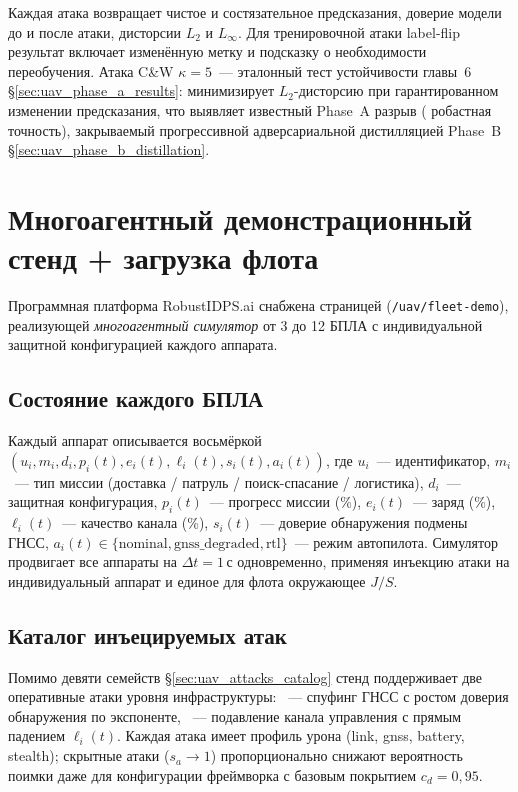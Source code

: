 Каждая атака возвращает чистое и состязательное предсказания,
доверие модели до и после атаки, дисторсии $L_2$ и $L_\infty$. Для
тренировочной атаки label-flip результат включает изменённую
метку и подсказку о необходимости переобучения. Атака C\&W
$\kappa{=}5$~--- эталонный тест устойчивости главы~6 \S\ref{sec:uav_phase_a_results}:
минимизирует $L_2$-дисторсию при гарантированном изменении
предсказания, что выявляет известный Phase~A разрыв (
робастная точность), закрываемый прогрессивной адверсариальной
дистилляцией Phase~B \S\ref{sec:uav_phase_b_distillation}.

\section{Многоагентный демонстрационный стенд + загрузка флота}
\label{sec:uav_fleet_demo}

Программная платформа RobustIDPS.ai снабжена страницей
 (\texttt{/uav/fleet-demo}), реализующей
\emph{многоагентный симулятор} от 3 до 12 БПЛА с
индивидуальной защитной конфигурацией каждого аппарата.

\subsection{Состояние каждого БПЛА}
\label{sec:fleet_state}

Каждый аппарат описывается восьмёркой
$(u_i, m_i, d_i, p_i(t), e_i(t), \ell_i(t), s_i(t), a_i(t))$,
где $u_i$~--- идентификатор, $m_i$~--- тип миссии (доставка / патруль /
поиск-спасание / логистика), $d_i$~--- защитная конфигурация,
$p_i(t)$~--- прогресс миссии (\%), $e_i(t)$~--- заряд (\%),
$\ell_i(t)$~--- качество канала (\%), $s_i(t)$~--- доверие
обнаружения подмены ГНСС, $a_i(t) \in
\{\text{nominal}, \text{gnss\_degraded}, \text{rtl}\}$~---
режим автопилота. Симулятор продвигает все аппараты на
$\Delta t = 1$\,с одновременно, применяя инъекцию атаки на
индивидуальный аппарат и единое для флота окружающее $J/S$.

\subsection{Каталог инъецируемых атак}
\label{sec:fleet_attack_catalog}

Помимо девяти семейств \S\ref{sec:uav_attacks_catalog} стенд
поддерживает две оперативные атаки уровня инфраструктуры:
~--- спуфинг ГНСС с ростом доверия обнаружения
по экспоненте, ~--- подавление канала
управления с прямым падением $\ell_i(t)$. Каждая атака имеет
профиль урона (link, gnss, battery, stealth); скрытные атаки
($s_a \to 1$) пропорционально снижают вероятность поимки даже
для конфигурации фреймворка с базовым покрытием $c_d = 0{,}95$.


